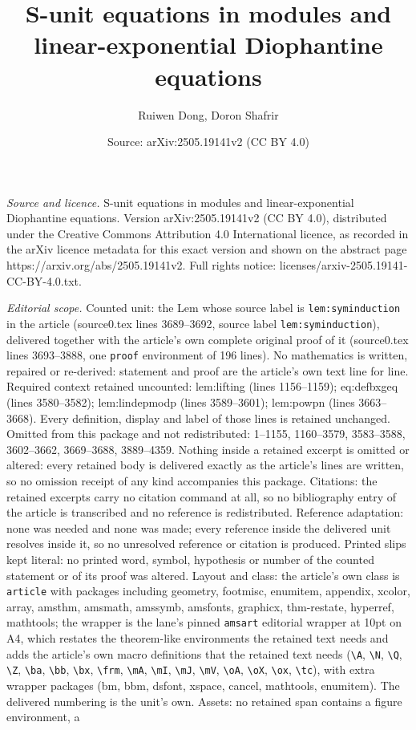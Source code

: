 \documentclass[10pt,a4paper]{amsart}
\title[S-unit equations in modules and linear-exponential Diophanti]{S-unit equations in modules and linear-exponential Diophantine equations}
\author{Ruiwen Dong, Doron Shafrir}
\date{Source: arXiv:2505.19141v2 (CC BY 4.0)}
\begin{document}
\maketitle

\noindent\emph{Source and licence.} S-unit equations in modules and linear-exponential Diophantine equations. Version arXiv:2505.19141v2 (CC BY 4.0), distributed under the Creative Commons Attribution 4.0 International licence, as recorded in the arXiv licence metadata for this exact version and shown on the abstract page https://arxiv.org/abs/2505.19141v2. Full rights notice: licenses/arxiv-2505.19141-CC-BY-4.0.txt.\par\smallskip

\noindent\textit{Editorial scope.} Counted unit: the Lem whose source label is \texttt{lem:syminduction} in the article (source0.tex lines 3689--3692, source label \texttt{lem:syminduction}), delivered together with the article's own complete original proof of it (source0.tex lines 3693--3888, one \texttt{proof} environment of 196 lines). No mathematics is written, repaired or re-derived: statement and proof are the article's own text line for line. Required context retained uncounted: lem:lifting (lines 1156--1159); eq:defbxgeq (lines 3580--3582); lem:lindepmodp (lines 3589--3601); lem:powpn (lines 3663--3668). Every definition, display and label of those lines is retained unchanged. Omitted from this package and not redistributed: 1--1155, 1160--3579, 3583--3588, 3602--3662, 3669--3688, 3889--4359. Nothing inside a retained excerpt is omitted or altered: every retained body is delivered exactly as the article's lines are written, so no omission receipt of any kind accompanies this package. Citations: the retained excerpts carry no citation command at all, so no bibliography entry of the article is transcribed and no reference is redistributed. Reference adaptation: none was needed and none was made; every reference inside the delivered unit resolves inside it, so no unresolved reference or citation is produced. Printed slips kept literal: no printed word, symbol, hypothesis or number of the counted statement or of its proof was altered. Layout and class: the article's own class is \texttt{article} with packages including geometry, footmisc, enumitem, appendix, xcolor, array, amsthm, amsmath, amssymb, amsfonts, graphicx, thm-restate, hyperref, mathtools; the wrapper is the lane's pinned \texttt{amsart} editorial wrapper at 10pt on A4, which restates the theorem-like environments the retained text needs and adds the article's own macro definitions that the retained text needs (\texttt{\textbackslash A}, \texttt{\textbackslash N}, \texttt{\textbackslash Q}, \texttt{\textbackslash Z}, \texttt{\textbackslash ba}, \texttt{\textbackslash bb}, \texttt{\textbackslash bx}, \texttt{\textbackslash frm}, \texttt{\textbackslash mA}, \texttt{\textbackslash mI}, \texttt{\textbackslash mJ}, \texttt{\textbackslash mV}, \texttt{\textbackslash oA}, \texttt{\textbackslash oX}, \texttt{\textbackslash ox}, \texttt{\textbackslash tc}), with extra wrapper packages (bm, bbm, dsfont, xspace, cancel, mathtools, enumitem). The delivered numbering is the unit's own. Assets: no retained span contains a figure environment, a 
\end{document}
